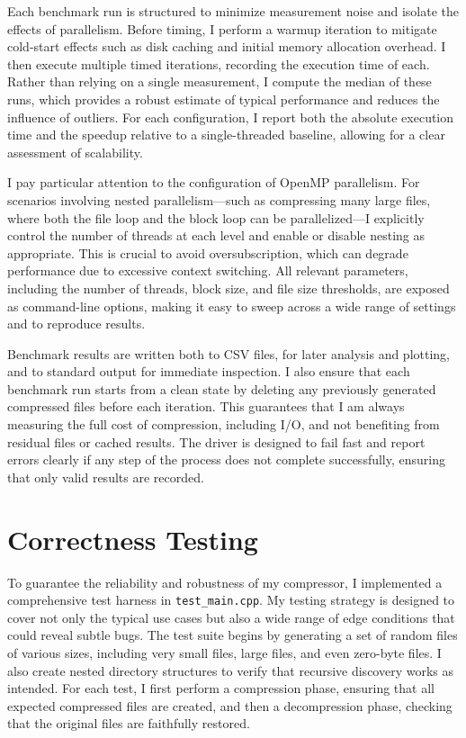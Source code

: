\documentclass[10pt]{article}
\begin{document}
Each benchmark run is structured to minimize measurement noise and isolate the effects of parallelism. Before timing, I perform a warmup iteration to mitigate cold-start effects such as disk caching and initial memory allocation overhead. I then execute multiple timed iterations, recording the execution time of each. Rather than relying on a single measurement, I compute the median of these runs, which provides a robust estimate of typical performance and reduces the influence of outliers. For each configuration, I report both the absolute execution time and the speedup relative to a single-threaded baseline, allowing for a clear assessment of scalability.

I pay particular attention to the configuration of OpenMP parallelism. For scenarios involving nested parallelism—such as compressing many large files, where both the file loop and the block loop can be parallelized—I explicitly control the number of threads at each level and enable or disable nesting as appropriate. This is crucial to avoid oversubscription, which can degrade performance due to excessive context switching. All relevant parameters, including the number of threads, block size, and file size thresholds, are exposed as command-line options, making it easy to sweep across a wide range of settings and to reproduce results.

Benchmark results are written both to CSV files, for later analysis and plotting, and to standard output for immediate inspection. I also ensure that each benchmark run starts from a clean state by deleting any previously generated compressed files before each iteration. This guarantees that I am always measuring the full cost of compression, including I/O, and not benefiting from residual files or cached results. The driver is designed to fail fast and report errors clearly if any step of the process does not complete successfully, ensuring that only valid results are recorded.

\section{Correctness Testing}
To guarantee the reliability and robustness of my compressor, I implemented a comprehensive test harness in \texttt{test\_main.cpp}. My testing strategy is designed to cover not only the typical use cases but also a wide range of edge conditions that could reveal subtle bugs. The test suite begins by generating a set of random files of various sizes, including very small files, large files, and even zero-byte files. I also create nested directory structures to verify that recursive discovery works as intended. For each test, I first perform a compression phase, ensuring that all expected compressed files are created, and then a decompression phase, checking that the original files are faithfully restored.
\end{document}

